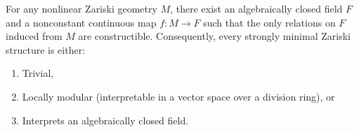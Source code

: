 For any nonlinear Zariski geometry $M$, there exist an algebraically closed field $F$ and a nonconstant continuous map $f : M \to F$ such that the only relations on $F$ induced from $M$ are constructible. Consequently, every strongly minimal Zariski structure is either:
\begin{enumerate}
\item Trivial,
\item Locally modular (interpretable in a vector space over a division ring), or
\item Interprets an algebraically closed field.
\end{enumerate}
